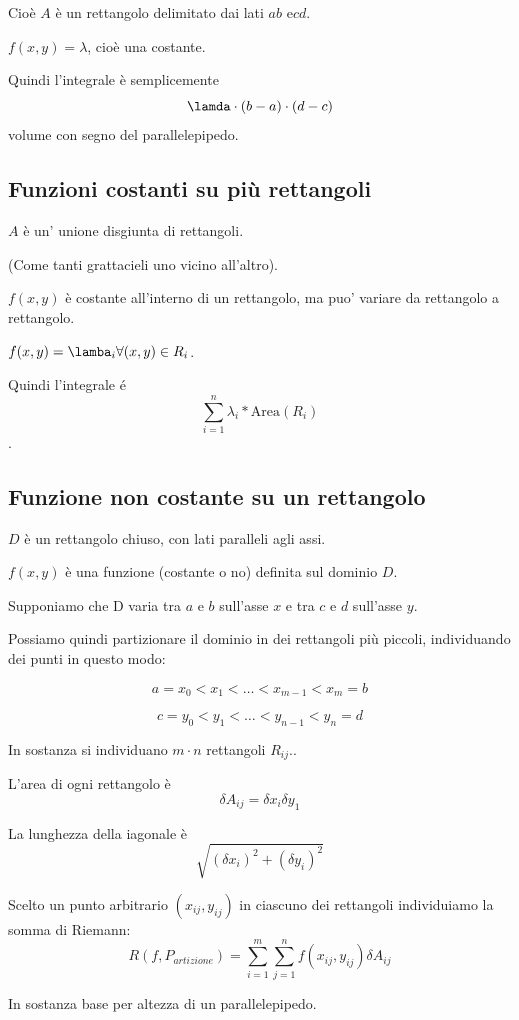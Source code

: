 Cioè $A$ è un rettangolo delimitato dai lati $ab$ e$cd$.

$f(x,y) = \lambda$, cioè una costante.

Quindi l'integrale è semplicemente $$\lamda \cdot (b-a) \cdot (d-c)$$ volume con segno del parallelepipedo.
 
\subsection{Funzioni costanti su più rettangoli}

$A$ è un' unione disgiunta di rettangoli.

(Come tanti grattacieli uno vicino all'altro).

$f(x,y)$ è costante all'interno di un rettangolo, ma puo' variare da rettangolo a rettangolo.

$f(x,y) = \lamba_i \forall (x,y) \in R_i$.

Quindi l'integrale é $$\sum_{i=1}^{n} \lambda_i * \text{Area}(R_i)$$.

\subsection{Funzione non costante su un rettangolo}

$D$ è un rettangolo chiuso, con lati paralleli agli assi. 

$f(x,y)$ è una funzione (costante o no) definita sul dominio $D$.

Supponiamo che D varia tra $a$ e $b$ sull'asse $x$ e tra $c$ e $d$ sull'asse $y$.

Possiamo quindi partizionare il dominio in dei rettangoli più piccoli, individuando dei punti in questo modo:

$$a = x_0 < x_1 < \ldots < x_{m-1} < x_m = b$$


$$c = y_0 < y_1 < \ldots < y_{n-1} < y_n = d$$

In sostanza si individuano $m \cdot n$ rettangoli $R_{ij}$..

L'area di ogni rettangolo è $$\delta A_{ij} = \delta x_i \delta y_1$$

La lunghezza della iagonale è 
$$\sqrt{(\delta x_i)^2+(\delta y_i)^2}$$

Scelto un punto arbitrario $(x_{ij},y_{ij})$ in ciascuno dei rettangoli individuiamo la somma di Riemann:
$$R(f,P_{artizione}) = \sum^m_{i=1} \sum^n_{j=1} f(x_{ij},y_{ij}) \delta A_{ij}$$

In sostanza base per altezza di un parallelepipedo.

